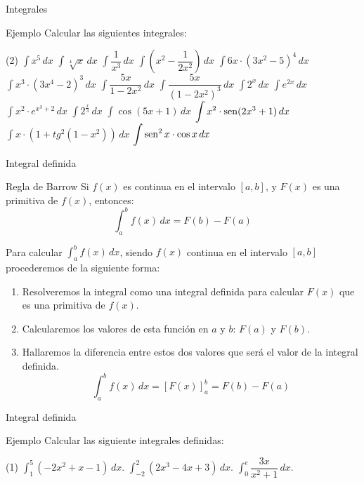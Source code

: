 \documentclass[8pt]{beamer}
\begin{document}
\begin{frame}[t]{Integrales}
\begin{exampleblock}{Ejemplo}
Calcular las siguientes integrales:
\begin{tasks}[label=\alph*)](2)
\task $\displaystyle \int x^5 \, dx$
\task $\displaystyle \int \sqrt[4]{x}\, dx$
\task $\displaystyle \int \dfrac{1}{x^3}\, dx$
\task $\displaystyle \int \left(x^2- \dfrac{1}{2x^2}\right)\, dx$
\task $\displaystyle \int 6x\cdot (3x^2-5)^4 \, dx$
\task $\displaystyle \int x^3 \cdot (3x^4-2)^3\, dx$
\task $\displaystyle \int \dfrac{5x}{1-2x^2}\, dx$
\task $\displaystyle \int \dfrac{5x}{(1-2x^2)^3}\, dx$
\task $\displaystyle \int 2^x \, dx$
\task $\displaystyle \int e^{2x} \, dx$
\task $\displaystyle \int x^2 \cdot e^{x^3+2} \, dx$
\task $\displaystyle \int 2^{\frac{x}{3}}\, dx$
\task $\displaystyle \int \cos(5x+1) \, dx$
\task $\displaystyle \int x^2\cdot \mathop{\rm sen}\nolimits (2x^3+1) \, dx$
\task $\displaystyle \int x\cdot (1+tg^2(1-x^2)) \, dx$
\task $\displaystyle \int \mathop{\rm sen}\nolimits^2x \cdot \cos x \, dx$
\end{tasks}
\end{exampleblock}
\end{frame}

\begin{frame}[t]{Integral definida}
\begin{alertblock}{Regla de Barrow}
Si $f(x)$ es continua en el intervalo $[a,b]$, y $F(x)$ es una primitiva de $f(x)$, entonces:
\[ \int_a^b f(x) \, dx = F(b)-F(a) \]
\end{alertblock}

\pause
Para calcular $\displaystyle \int_a^b f(x) \, dx$, siendo $f(x)$ continua en el intervalo $[a,b]$ procederemos de la siguiente forma:

\begin{enumerate}[<+-| alert@+>]
\item Resolveremos la integral como una integral definida para calcular $F(x)$ que es una primitiva de $f(x)$.
\item Calcularemos los valores de esta función en $a$ y $b$: $F(a)$ y $F(b)$.
\item Hallaremos la diferencia entre estos dos valores que será el valor de la integral definida.
\[ \int_a^b f(x) \, dx = \left[ F(x) \right]_a^b =  F(b)-F(a) \]
\end{enumerate}
\end{frame}

\begin{frame}[t]{Integral definida}
\begin{exampleblock}{Ejemplo}
Calcular las siguiente integrales definidas:
\begin{tasks}[label=\alph*)](1)
\task  $ \displaystyle \int_1^5 (-2x^2+x-1) \, dx $.
\task  $ \displaystyle \int_{-2}^2 (2x^3-4x+3) \, dx $.
\task  $ \displaystyle \int_0^e \dfrac{3x}{x^2+1} \, dx $.
\end{tasks}

\end{exampleblock}
\end{frame}
\end{document}

